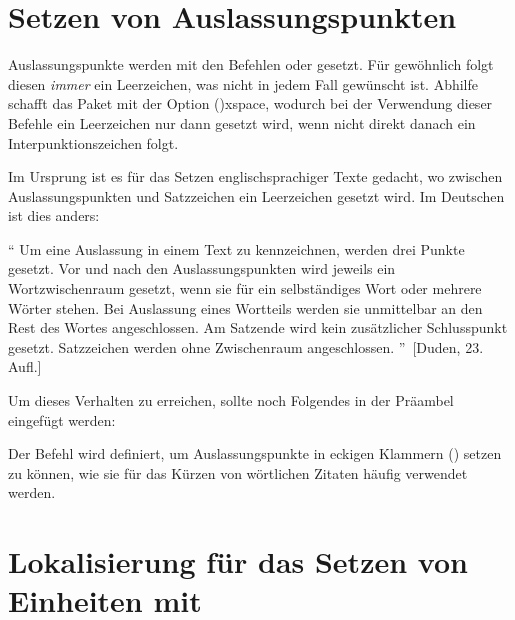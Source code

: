 \section{%
  Setzen von Auslassungspunkten%
  \label{sec:tips:dots}%
}

%
Auslassungspunkte werden mit den Befehlen  oder  
gesetzt. Für gewöhnlich folgt diesen \emph{immer} ein Leerzeichen, was nicht in 
jedem Fall gewünscht ist. Abhilfe schafft das Paket  mit der 
Option \Option*(){xspace}, wodurch bei der Verwendung dieser 
Befehle ein Leerzeichen nur dann gesetzt wird, wenn nicht direkt danach ein 
Interpunktionszeichen folgt.
%
\begin{quoting}
\begin{Code}
\usepackage[xspace]{ellipsis}
\end{Code}
\end{quoting}
%
Im Ursprung ist es für das Setzen englischsprachiger Texte gedacht, wo zwischen 
Auslassungspunkten und Satzzeichen ein Leerzeichen gesetzt wird. Im Deutschen 
ist dies anders:
%
\begin{quoting}
\enquote{%
  Um eine Auslassung in einem Text zu kennzeichnen, werden drei Punkte gesetzt. 
  Vor und nach den Auslassungspunkten wird jeweils ein Wortzwischenraum 
  gesetzt, wenn sie für ein selbständiges Wort oder mehrere Wörter stehen. Bei 
  Auslassung eines Wortteils werden sie unmittelbar an den Rest des Wortes 
  angeschlossen. Am Satzende wird kein zusätzlicher Schlusspunkt gesetzt. 
  Satzzeichen werden ohne Zwischenraum angeschlossen.%
}~[Duden, 23. Aufl.]
\end{quoting} 
%
Um dieses Verhalten zu erreichen, sollte noch Folgendes in der Präambel 
eingefügt werden:
%
\begin{quoting}
\begin{Code}
\let\ellipsispunctuation\relax
\newcommand*\qdots{[\dots{}]\xspace}
\end{Code}
\end{quoting}
%
Der Befehl  wird definiert, um Auslassungspunkte in eckigen 
Klammern (\OPValue{\dots}) setzen zu können, wie sie für das Kürzen von 
wörtlichen Zitaten häufig verwendet werden.



\section{%
  Lokalisierung für das Setzen von Einheiten mit %
  \label{sec:tips:siunitx}%
}

